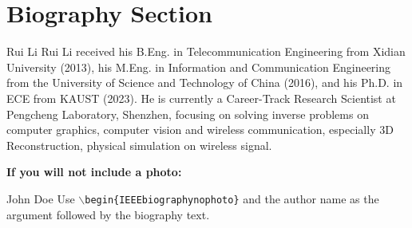 \documentclass[lettersize,journal]{IEEEtran}
\begin{document}

{
    \small
    
    
}


\newpage

\section{Biography Section}
 

\begin{IEEEbiography}{Rui Li} Rui Li received his B.Eng. in Telecommunication Engineering from Xidian University (2013), his M.Eng. in Information and Communication Engineering from the University of Science and Technology of China (2016), and his Ph.D. in ECE from KAUST (2023). He is currently a Career-Track Research Scientist at Pengcheng Laboratory, Shenzhen, focusing on solving inverse problems on computer graphics, computer vision and wireless communication, especially 3D Reconstruction, physical simulation on wireless signal.
\end{IEEEbiography}

\vspace{11pt}

\bf{If you will not include a photo:}\vspace{-33pt}
\begin{IEEEbiographynophoto}{John Doe}
Use $\backslash${\tt{begin\{IEEEbiographynophoto\}}} and the author name as the argument followed by the biography text.
\end{IEEEbiographynophoto}




\vfill
\end{document}

